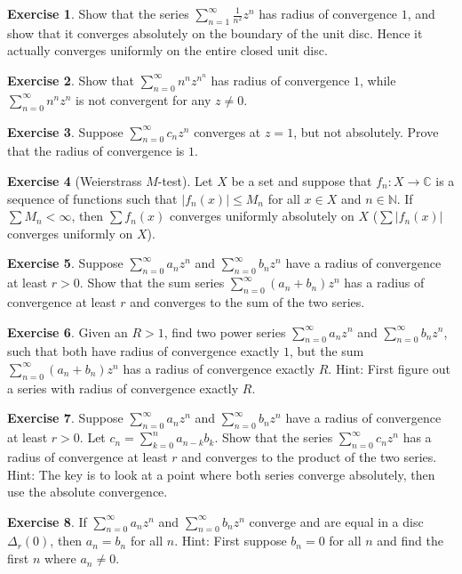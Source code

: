 \documentclass[12pt,openany]{book}
\newcommand{\sabs}[1]{\lvert {#1} \rvert}
\newcommand{\abs}[1]{\left\lvert {#1} \right\rvert}
\newcommand{\C}{{\mathbb{C}}}
\newcommand{\N}{{\mathbb{N}}}
\theoremstyle{plain}
\theoremstyle{remark}
\theoremstyle{definition}
\newenvironment{exbox}{%
    \def\FrameCommand{\vrule width 1pt \relax\hspace{10pt}}%
    \MakeFramed{\advance\hsize-\width\FrameRestore}%
}{%
    \endMakeFramed
}
\theoremstyle{exercise}
\newtheorem{exercise}{Exercise}[section]
\theoremstyle{example}
\begin{document}
\begin{exbox}
\begin{exercise}
Show that the series $\sum_{n=1}^\infty \frac{1}{n^2} z^{n}$ has radius of
convergence $1$, and
show that it converges absolutely on the boundary of the unit disc.  Hence
it actually converges uniformly on the entire closed unit disc.
\end{exercise}

\begin{exercise}
Show that
$\sum_{n=0}^\infty n^n z^{n^n}$ has radius of convergence $1$,
while
$\sum_{n=0}^\infty n^n z^{n}$ is not convergent 
for any $z \not= 0$.
\end{exercise}

\begin{exercise}
Suppose
$\sum_{n=0}^\infty c_n z^{n}$ converges at $z=1$, but not absolutely.
Prove that the radius of convergence is $1$.
\end{exercise}

\begin{exercise}[Weierstrass $M$-test]
\label{exercise:weierMtest}
Let $X$ be a set and suppose that $f_n \colon X \to \C$ is
a sequence of functions such that
$\abs{f_n(x)} \leq M_n$ for all $x \in X$ and $n \in \N$.  If $\sum M_n <
\infty$, then $\sum f_n(x)$ converges uniformly absolutely on $X$
($\sum \sabs{f_n(x)}$ converges uniformly on $X$).
\end{exercise}

\begin{exercise}
Suppose
$\sum_{n=0}^\infty a_n z^{n}$ and $\sum_{n=0}^\infty b_n z^{n}$
have a radius of convergence at least $r > 0$.  Show that
the sum series
$\sum_{n=0}^\infty (a_n+b_n) z^{n}$ has a radius of convergence at least
$r$ and converges to the sum of the two series.
\end{exercise}

\begin{exercise}
Given an $R > 1$, find two power series
$\sum_{n=0}^\infty a_n z^{n}$ and $\sum_{n=0}^\infty b_n z^{n}$,
such that both have radius of convergence exactly $1$, but the 
sum
$\sum_{n=0}^\infty (a_n+b_n) z^{n}$ has a radius of convergence 
exactly $R$.  Hint: First figure out a series with radius of convergence
exactly $R$.
\end{exercise}

\begin{exercise}
Suppose
$\sum_{n=0}^\infty a_n z^{n}$ and $\sum_{n=0}^\infty b_n z^{n}$
have a radius of convergence at least $r > 0$.  Let 
$c_n = \sum_{k=0}^n a_{n-k}b_k$.  Show that
the series
$\sum_{n=0}^\infty c_n z^{n}$ has a radius of convergence at least
$r$ and converges to the product of the two series.
Hint: The key is to look at a point where both series converge absolutely,
then use the absolute convergence.
\end{exercise}

\begin{exercise}
If $\sum_{n=0}^\infty a_n z^{n}$ and $\sum_{n=0}^\infty b_n z^{n}$
converge and are equal in a disc $\Delta_r(0)$, then $a_n = b_n$
for all $n$.  Hint: First suppose $b_n = 0$ for all $n$
and find the first $n$ where $a_n \not=0$.
\end{exercise}
\end{exbox}
\end{document}
